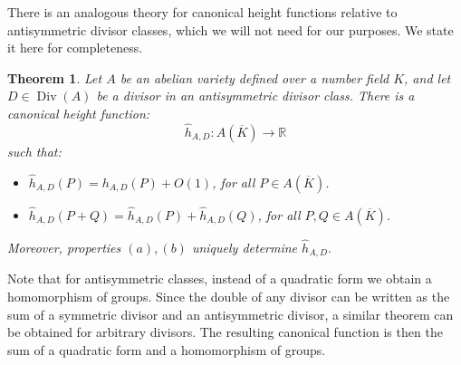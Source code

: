 \documentclass[a4paper, 12pt]{amsart}
\theoremstyle{definition}
\theoremstyle{plain}
\theoremstyle{plain}
\newtheorem{thm0}[defn0]{Theorem}
\theoremstyle{plain}
\theoremstyle{plain}
\theoremstyle{remark}
\theoremstyle{remark}
\theoremstyle{plain}
\newenvironment{theorem}{ \begin{thm0}}{\end{thm0}}
\DeclareMathOperator{\Div}{Div}
\begin{document}
	There is an analogous theory for canonical height functions relative to antisymmetric divisor classes, which we will not need for our purposes. We state it here for completeness.
	\begin{theorem}
		Let $A$ be an abelian variety defined over a number field $K$, and let $D\in\Div(A)$ be a divisor in an antisymmetric divisor class. There is a canonical height function:
		\begin{equation*}
			\hat{h}_{A,D}:A(\overline{K})\rightarrow\mathbb{R}
		\end{equation*}
		such that:
		\begin{itemize}
			\item[(a)] $\hat{h}_{A,D}(P)=h_{A,D}(P)+O(1)$, for all $P\in A(\overline{K})$.
			\item[(b)] $\hat{h}_{A,D}(P+Q)=\hat{h}_{A,D}(P)+\hat{h}_{A,D}(Q)$, for all $P,Q\in A(\overline{K})$.
		\end{itemize}
		Moreover, properties $(a),(b)$ uniquely determine $\hat{h}_{A,D}$.
	\end{theorem}
	Note that for antisymmetric classes, instead of a quadratic form we obtain a homomorphism of groups. Since the double of any divisor can be written as the sum of a symmetric divisor and an antisymmetric divisor, a similar theorem can be obtained for arbitrary divisors. The resulting canonical function is then the sum of a quadratic form and a homomorphism of groups.
		
\end{document}
